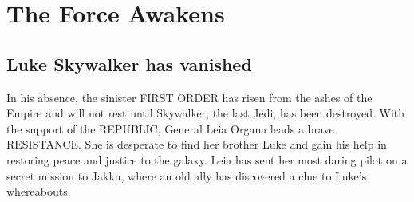 \chapter{The Force Awakens}
\section{Luke Skywalker has vanished}
In his absence, the sinister FIRST ORDER has risen from the 
ashes of the Empire and will not rest until Skywalker, the 
last Jedi, has been destroyed. With the support of the 
REPUBLIC, General Leia Organa leads a brave RESISTANCE. She 
is desperate to find her brother Luke and gain his help in 
restoring peace and justice to the galaxy. Leia has sent her 
most daring pilot on a secret mission to Jakku, where an old 
ally has discovered a clue to Luke's whereabouts.

\lipsum[1-10]
\cite{MATSUI_1986}
